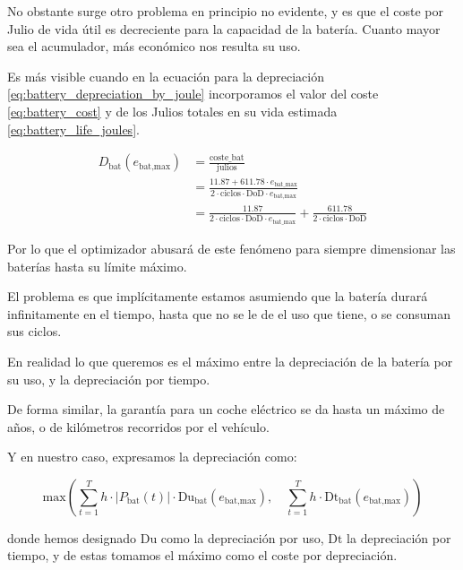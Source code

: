 No obstante surge otro problema en principio no evidente, y es que el coste por
Julio de vida útil es decreciente para la capacidad de la batería. Cuanto mayor
sea el acumulador, más económico nos resulta su uso.

Es más visible cuando en la ecuación para la depreciación
\eqref{eq:battery_depreciation_by_joule} incorporamos el valor del coste
\eqref{eq:battery_cost} y de los Julios totales en su vida estimada
\eqref{eq:battery_life_joules}.

\begin{align}
	D_\text{bat}(e_\text{bat,max}) & = \frac{\text{coste\_bat}}{\text{julios}} \nonumber                                                                                       \\
	                               & = \frac{11.87 + 611.78 \cdot e_{\text{bat\_max}}}{2 \cdot \text{ciclos} \cdot \text{DoD} \cdot e_\text{bat,max}} \nonumber                \\
	                               & = \frac{11.87}{2 \cdot \text{ciclos} \cdot \text{DoD} \cdot e_{\text{bat\_max}}} +  \frac{611.78}{2 \cdot \text{ciclos} \cdot \text{DoD}}
\end{align}

Por lo que el optimizador abusará de este fenómeno para siempre dimensionar las
baterías hasta su límite máximo.

El problema es que implícitamente estamos asumiendo que la batería durará
infinitamente en el tiempo, hasta que no se le de el uso que tiene, o se
consuman sus ciclos.

En realidad lo que queremos es el máximo entre la depreciación de la batería
por su uso, y la depreciación por tiempo.

De forma similar, la garantía para un coche eléctrico se da hasta un máximo de
años, o de kilómetros recorridos por el vehículo.

Y en nuestro caso, expresamos la depreciación como:

\begin{equation}
	\text{max} \left( \sum_{t=1}^{T} h \cdot |P_\text{bat}(t)| \cdot \text{Du}_\text{bat}(e_\text{bat,max}), \quad \sum_{t=1}^{T} h \cdot \text{Dt}_\text{bat}(e_\text{bat,max}) \right)
\end{equation}

donde hemos designado $\text{Du}$ como la depreciación por uso, $\text{Dt}$ la
depreciación por tiempo, y de estas tomamos el máximo como el coste por
depreciación.

